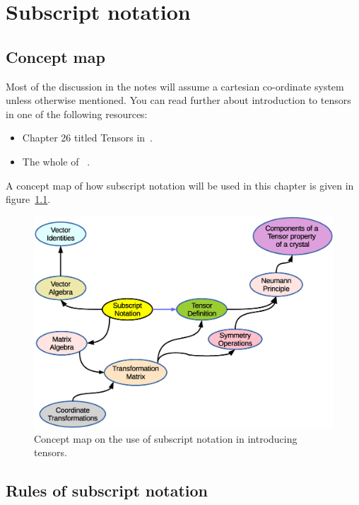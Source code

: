 \chapter{Subscript notation}
\label{ch:subnot1}


\section{Concept map}

Most of the discussion in the notes will assume a cartesian co-ordinate system unless otherwise mentioned.
You can read further about introduction to tensors in one of the following resources:
\begin{itemize}
\item Chapter 26 titled Tensors in~\cite{riley}.
\item The whole of ~\cite{bourne}.
\end{itemize}



A concept map of how subscript notation will be used in this chapter is given in figure~\ref{subcmap}.
\begin{figure}[h]
 \centering
 \includegraphics[width=5 in]{images/c02-SubscriptConceptMap.eps}
 \caption{Concept map on the use of subscript notation in introducing tensors.}
 \label{subcmap}
\end{figure}



\section{Rules of subscript notation}

